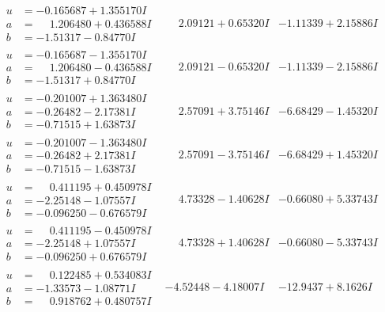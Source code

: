 \documentclass[1p]{elsarticle_modified}
\theoremstyle{definition}
\begin{document}
$$\begin{array}{c|c|c}
\begin{aligned}
u &= -0.165687 + 1.355170 I \\
a &= \phantom{-}1.206480 + 0.436588 I \\
b &= -1.51317 - 0.84770 I\end{aligned}
 & \phantom{-}2.09121 + 0.65320 I & -1.11339 + 2.15886 I \\ \hline\begin{aligned}
u &= -0.165687 - 1.355170 I \\
a &= \phantom{-}1.206480 - 0.436588 I \\
b &= -1.51317 + 0.84770 I\end{aligned}
 & \phantom{-}2.09121 - 0.65320 I & -1.11339 - 2.15886 I \\ \hline\begin{aligned}
u &= -0.201007 + 1.363480 I \\
a &= -0.26482 - 2.17381 I \\
b &= -0.71515 + 1.63873 I\end{aligned}
 & \phantom{-}2.57091 + 3.75146 I & -6.68429 - 1.45320 I \\ \hline\begin{aligned}
u &= -0.201007 - 1.363480 I \\
a &= -0.26482 + 2.17381 I \\
b &= -0.71515 - 1.63873 I\end{aligned}
 & \phantom{-}2.57091 - 3.75146 I & -6.68429 + 1.45320 I \\ \hline\begin{aligned}
u &= \phantom{-}0.411195 + 0.450978 I \\
a &= -2.25148 - 1.07557 I \\
b &= -0.096250 - 0.676579 I\end{aligned}
 & \phantom{-}4.73328 - 1.40628 I & -0.66080 + 5.33743 I \\ \hline\begin{aligned}
u &= \phantom{-}0.411195 - 0.450978 I \\
a &= -2.25148 + 1.07557 I \\
b &= -0.096250 + 0.676579 I\end{aligned}
 & \phantom{-}4.73328 + 1.40628 I & -0.66080 - 5.33743 I \\ \hline\begin{aligned}
u &= \phantom{-}0.122485 + 0.534083 I \\
a &= -1.33573 - 1.08771 I \\
b &= \phantom{-}0.918762 + 0.480757 I\end{aligned}
 & -4.52448 - 4.18007 I & -12.9437 + 8.1626 I \\ \hline\begin{aligned}

\end{aligned}
\end{array}$$
\end{document}
